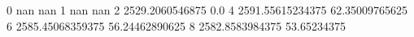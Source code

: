 0 nan nan
1 nan nan
2 2529.2060546875 0.0
4 2591.55615234375 62.35009765625
6 2585.45068359375 56.24462890625
8 2582.8583984375 53.65234375
